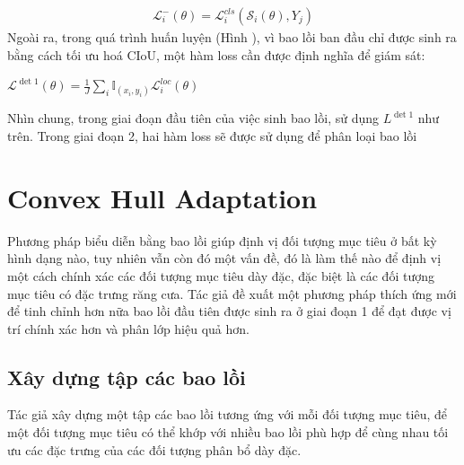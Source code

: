 \documentclass[12pt,a4paper,openany,oneside]{report}
\begin{document}
\begin{align} \label{loss_negative_convex}
	\mathcal{L}_i^{-}(\theta)=\mathcal{L}_i^{c l s}\left(\mathcal{S}_i(\theta), Y_j\right)
\end{align}
Ngoài ra, trong quá trình huấn luyện (Hình ), vì bao lồi ban đầu chỉ được sinh ra bằng cách tối ưu hoá CIoU, một hàm loss cần được định nghĩa để giám sát:
\begin{center}
	$\mathcal{L}^{\operatorname{det} 1}(\theta)=\frac{1}{J} \sum_i \mathbb{I}_{\left(x_i, y_i\right)} \mathcal{L}_i^{l o c}(\theta)$
\end{center}
Nhìn chung, trong giai đoạn đầu tiên của việc sinh bao lồi, sử dụng $L^{\operatorname{det} 1}$ như trên. Trong giai đoạn 2, hai hàm loss sẽ được sử dụng để phân loại bao lồi
\section{Convex Hull Adaptation}
Phương pháp biểu diễn bằng bao lồi giúp định vị đối tượng mục tiêu ở bất kỳ hình dạng nào, tuy nhiên vẫn còn đó một vấn đề, đó là làm thế nào để định vị một cách chính xác các đối tượng mục tiêu dày đặc, đặc biệt là các đối tượng mục tiêu có đặc trưng răng cưa. Tác giả đề xuất một phương pháp thích ứng mới để tinh chỉnh hơn nữa bao lồi đầu tiên được sinh ra ở giai đoạn 1 để đạt được vị trí chính xác hơn và phân lớp hiệu quả hơn.
\subsection{Xây dựng tập các bao lồi}
Tác giả xây dựng một tập các bao lồi tương ứng với mỗi đối tượng mục tiêu, để một đối tượng mục tiêu có thể khớp với nhiều bao lồi phù hợp để cùng nhau tối ưu các đặc trưng của các đối tượng phân bổ dày đặc.
\end{document}
